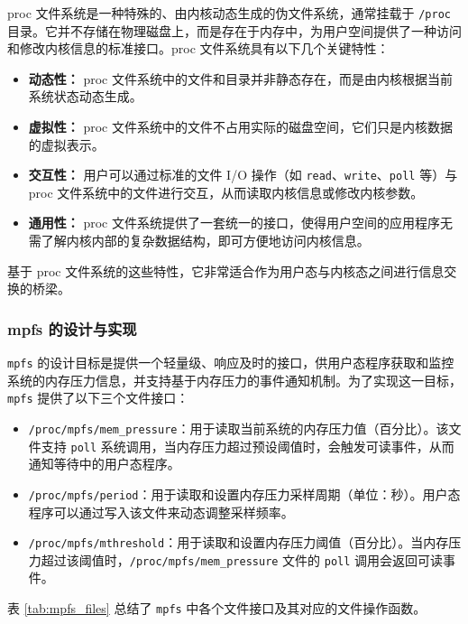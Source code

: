 proc 文件系统是一种特殊的、由内核动态生成的伪文件系统，通常挂载于 \texttt{/proc} 目录。它并不存储在物理磁盘上，而是存在于内存中，为用户空间提供了一种访问和修改内核信息的标准接口。proc 文件系统具有以下几个关键特性：

\begin{itemize}
    \item \textbf{动态性：} proc 文件系统中的文件和目录并非静态存在，而是由内核根据当前系统状态动态生成。
    \item \textbf{虚拟性：} proc 文件系统中的文件不占用实际的磁盘空间，它们只是内核数据的虚拟表示。
    \item \textbf{交互性：} 用户可以通过标准的文件 I/O 操作（如 \texttt{read}、\texttt{write}、\texttt{poll} 等）与 proc 文件系统中的文件进行交互，从而读取内核信息或修改内核参数。
    \item \textbf{通用性：} proc 文件系统提供了一套统一的接口，使得用户空间的应用程序无需了解内核内部的复杂数据结构，即可方便地访问内核信息。
\end{itemize}

基于 proc 文件系统的这些特性，它非常适合作为用户态与内核态之间进行信息交换的桥梁。

\subsubsection{mpfs 的设计与实现}

\texttt{mpfs} 的设计目标是提供一个轻量级、响应及时的接口，供用户态程序获取和监控系统的内存压力信息，并支持基于内存压力的事件通知机制。为了实现这一目标，\texttt{mpfs} 提供了以下三个文件接口：

\begin{itemize}
    \item \texttt{/proc/mpfs/mem\_pressure}：用于读取当前系统的内存压力值（百分比）。该文件支持 \texttt{poll} 系统调用，当内存压力超过预设阈值时，会触发可读事件，从而通知等待中的用户态程序。
    \item \texttt{/proc/mpfs/period}：用于读取和设置内存压力采样周期（单位：秒）。用户态程序可以通过写入该文件来动态调整采样频率。
    \item \texttt{/proc/mpfs/mthreshold}：用于读取和设置内存压力阈值（百分比）。当内存压力超过该阈值时，\texttt{/proc/mpfs/mem\_pressure} 文件的 \texttt{poll} 调用会返回可读事件。
\end{itemize}

表 \ref{tab:mpfs_files} 总结了 \texttt{mpfs} 中各个文件接口及其对应的文件操作函数。

